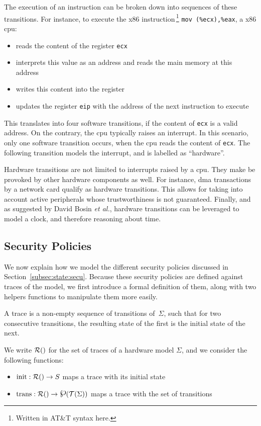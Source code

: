 The execution of an instruction can be broken down into sequences of these
transitions.
%
For instance, to execute the x86 instruction\,\footnote{Written in AT\&T syntax
  here.} \texttt{mov (\%ecx),\%eax}, a x86 \ac{cpu}:
%
\begin{itemize}
\item reads the content of the register \texttt{ecx}
%
\item interprets this value as an address and reads the main memory at this
  address
%
\item writes this content into the register 
%
\item updates the register \texttt{eip} with the address of the next instruction
  to execute
\end{itemize}

This translates into four software transitions, if the content of \texttt{ecx}
is a valid address.
%
On the contrary, the \ac{cpu} typically raises an interrupt.
%
In this scenario, only one software transition occurs, when the \ac{cpu} reads
the content of \texttt{ecx}.
%
The following transition models the interrupt, and is labelled as ``hardware''.

Hardware transitions are not limited to interrupts raised by a \ac{cpu}.
%
They make be provoked by other hardware components as well.
%
For instance, \ac{dma} transactions by a network card qualify as hardware
transitions.
%
This allows for taking into account active peripherals whose trustworthiness is
not guaranteed.
%
Finally, and as suggested by David Bosin \emph{et al.}, hardware transitions can
be leveraged to model a clock, and therefore reasoning about time.

\subsection{Security Policies}
\label{subsec:speccert:security}

We now explain how we model the different security policies discussed in
Section~\ref{subsec:state:secu}.
%
Because these security policies are defined against traces of the model, we
first introduce a formal definition of them, along with two helpers functions to
manipulate them more easily.

\begin{definition}[Traces]
  \label{def:speccert:trace}
  A trace is a non-empty sequence of transitions of~$\Sigma$, such that for two
  consecutive transitions, the resulting state of the first is the initial state
  of the next.

  We write $\pathesLTS{Ez}$ for the set of traces of a hardware model $\Sigma$,
  and we consider the following functions:
  \begin{itemize}
  \item $\func{init} : \pathesLTS{Ez} \rightarrow S$ maps a trace with its
    initial state
  \item
    $\func{trans} : \pathesLTS{Ez} \rightarrow \powerset(\mathcal{T}(\Sigma))$
    maps a trace with the set of transitions
  \end{itemize}
\end{definition}

